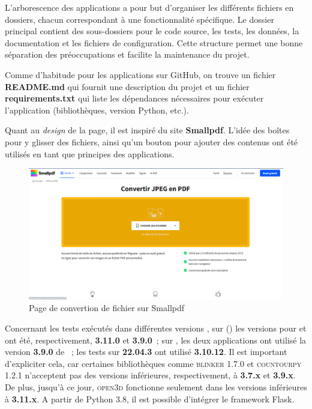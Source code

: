     L'arborescence des applications a pour but d'organiser les différents fichiers en dossiers, chacun correspondant à une fonctionnalité spécifique. Le dossier principal contient des sous-dossiers pour le code source, les tests, les données, la documentation et les fichiers de configuration. Cette structure permet une bonne séparation des préoccupations et facilite la maintenance du projet.
     
    Comme d'habitude pour les applications sur GitHub, on trouve un fichier \textbf{README.md} qui fournit une description du projet et un fichier \textbf{requirements.txt} qui liste les dépendances nécessaires pour exécuter l'application (bibliothèques, version Python, etc.). 

    Quant au \textit{design} de la page, il est inspiré du site \textbf{Smallpdf}. L'idée des boîtes pour y glisser des fichiers, ainsi qu'un bouton pour ajouter des contenus ont été utilisés en tant que principes des applications. 

        \begin{figure}[h!]
            \centering
            \includegraphics[width=12cm]{02_images/part_02/05_small_pdf.png}
            \caption{Page de convertion de fichier sur Smallpdf}
        \end{figure}
    
    Concernant les tests exécutés dans différentes versions \py, sur  () les versions \py pour \cvt et \msh ont été, respectivement, \textbf{3.11.0} et \textbf{3.9.0}~; sur , les deux applications ont utilisé la version \textbf{3.9.0} de \py~; les tests sur  \textbf{22.04.3} ont utilisé \py \textbf{3.10.12}. Il est important d'expliciter cela, car certaines bibliothèques comme \textsc{blinker 1.7.0} et \textsc{countourpy 1.2.1} n'acceptent pas des versions \py inférieures, respectivement, à \textbf{3.7.x} et \textbf{3.9.x}. De plus, jusqu'à ce jour, \textsc{open3d} fonctionne seulement dans les versions \py inférieures à \textbf{3.11.x}. A partir de Python 3.8, il est possible d'intégrer le framework Flask.

